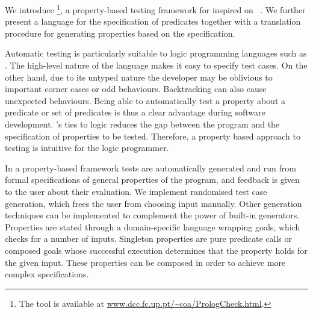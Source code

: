 We introduce \plqc{}\footnote{The \plqc{} tool is available at \url{www.dcc.fc.up.pt/~coa/PrologCheck.html}.},
a property-based testing framework for \Prolog{} inspired on
 \QuickCheck~\cite{quickcheck}.
%
We further present a language for the specification of \Prolog{} predicates
together with a translation procedure for generating \plqc{} properties
based on the specification.


Automatic testing is particularly suitable to logic programming languages such as
\Prolog{}. The high-level nature of the language makes it easy to
specify test cases.
%
On the other hand, due to its untyped nature the developer may be
oblivious to important corner cases or odd behaviours.
%
Backtracking can also cause unexpected behaviours. %
%
Being able to automatically test a property about a predicate or set of
predicates is thus a clear advantage during software development.
%
\Prolog{}'s ties to logic reduces the gap between the program and the
specification of properties to be tested.
%
Therefore, a property based approach to testing is intuitive for the
logic programmer.

In a property-based framework tests are automatically generated and run from formal specifications of general
properties of the program, and feedback is given to the user about their
evaluation.
%
We implement randomised test case generation, which frees the user
from choosing input manually.
%
Other generation techniques
\cite{naylor2007logic,runciman2008smallcheck,Duregard-2012-feat} can be
implemented to complement the power of built-in generators.
%
Properties are stated through a domain-specific language wrapping
\Prolog{} goals, which \plqc{} checks for a number of inputs. 
%
Singleton properties are pure predicate calls
or composed goals whose successful execution determines that the
property holds for the given input.
%
These properties can be composed in order to achieve more complex
specifications.




